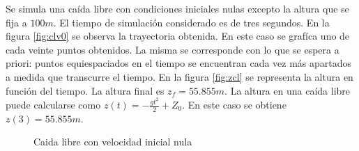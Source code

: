 \documentclass[main]{subfiles}
\begin{document}
Se simula una ca\'ida libre con condiciones iniciales nulas excepto la altura que se fija a $100m$. El tiempo de simulaci\'on considerado es de tres segundos. En la figura \ref{fig:clv0} se observa la trayectoria obtenida. En este caso se graf\'ica uno de cada veinte puntos obtenidos. La misma se corresponde con lo que se espera a priori: puntos equiespaciados en el tiempo se encuentran cada vez m\'as apartados a medida que transcurre el tiempo. En la figura \ref{fig:zcl} se representa la altura en funci\'on del tiempo. La altura final es $z_f=55.855m$. La altura en una ca\'ida libre puede calcularse como $z(t)=-\frac{gt^2}{2}+Z_0$. En este caso se obtiene $z(3)=55.855m$.



\begin{figure} [h!]
  \centering
 
  \caption{Caida libre con velocidad inicial nula}
  \label{fig:caida_libre}
\end{figure}
\end{document}
